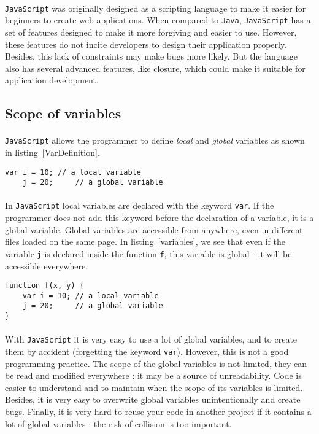 \paragraph{} 
\texttt{JavaScript} was originally designed as a scripting language to make it easier for beginners to create web applications. When compared to \texttt{Java}, \texttt{JavaScript} has a set of features designed to make it more forgiving and easier to use. However, these features do not incite developers to design their application properly. Besides, this lack of constraints may make bugs more likely. But the language also has several advanced features, like closure, which could make it suitable for application development.

\subsection{Scope of variables}

\paragraph{}
\texttt{JavaScript} allows the programmer to define \emph{local} and \emph{global} variables as shown in listing~\ref{VarDefinition}.
\begin{lstlisting}[caption={Defining variables}, label={VarDefinition}]
    var i = 10; // a local variable
    j = 20;     // a global variable
\end{lstlisting}

\paragraph{}
In \texttt{JavaScript} local variables are declared with the keyword \texttt{var}. If the programmer does not add this keyword before the declaration of a variable, it is a global variable. Global variables are accessible from anywhere, even in different files loaded on the same page. In listing~\ref{variables}, we see that even if the variable \texttt{j} is declared inside the function \texttt{f}, this variable is global - it will be accessible everywhere.  
\begin{lstlisting}[caption={Global and local variables}, label={variables}]
function f(x, y) {
    var i = 10; // a local variable
    j = 20;     // a global variable
}
\end{lstlisting}

\paragraph{}
With \texttt{JavaScript} it is very easy to use a lot of global variables, and to create them by accident (forgetting the keyword \texttt{var}). However, this is not a good programming practice. The scope of the global variables is not limited, they can be read and modified everywhere : it may be a source of unreadability. Code is easier to understand and to maintain when the scope of its variables is limited. Besides, it is very easy to overwrite global variables unintentionally and create bugs. Finally, it is very hard to reuse your code in another project if it contains a lot of global variables : the risk of collision is too important.


